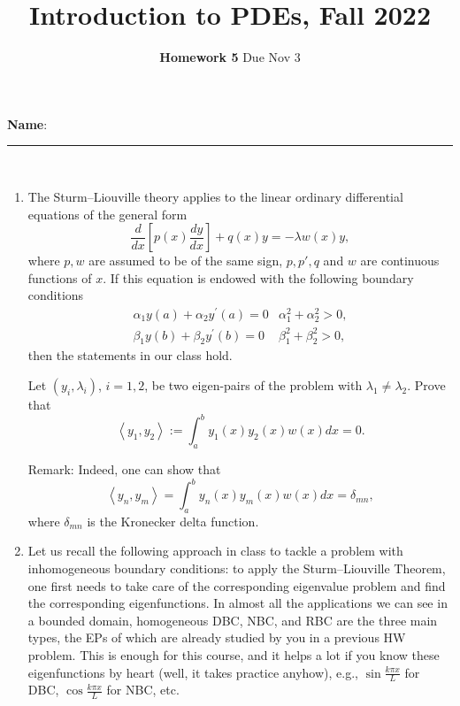 \documentclass[6pt]{article}
\title{Introduction to PDEs, Fall 2022}
\author{\textbf{Homework 5} Due Nov 3}
\date{}
\numberwithin{equation}{section}
\begin{document}
\maketitle

\textbf{Name}:\rule{1 in}{0.001 in} \\
\begin{enumerate}

\item The Sturm--Liouville theory applies to the linear ordinary differential equations of the general form
\[\frac{d}{d x}\left[p(x) \frac{d y}{d x}\right]+q(x) y=-\lambda w(x) y,\]
where $p,w$ are assumed to be of the same sign, $p,p',q$ and $w$ are continuous functions of $x$.  If this equation is endowed with the following boundary conditions
\[
\begin{array}{ll}
\alpha_1 y(a)+\alpha_2 y^{\prime}(a)=0 & \alpha_1^2+\alpha_2^2>0, \\
\beta_1 y(b)+\beta_2 y^{\prime}(b)=0 & \beta_1^2+\beta_2^2>0,
\end{array}
\]
then the statements in our class hold.

Let $(y_i,\lambda_i)$, $i=1,2$, be two eigen-pairs of the problem with $\lambda_1\neq\lambda_2$.  Prove that
\[\left\langle y_1, y_2\right\rangle:=\int_a^b y_1(x) y_2(x) w(x) d x=0.\]

Remark:  Indeed, one can show that
\[\left\langle y_n, y_m\right\rangle=\int_a^b y_n(x) y_m(x) w(x) d x=\delta_{m n},\]
where $\delta_{m n}$ is the Kronecker delta function.

\item Let us recall the following approach in class to tackle a problem with inhomogeneous boundary conditions: to apply the Sturm--Liouville Theorem, one first needs to take care of the corresponding eigenvalue problem and find the corresponding eigenfunctions.  In almost all the applications we can see in a bounded domain, homogeneous DBC, NBC, and RBC are the three main types, the EPs of which are already studied by you in a previous HW problem.  This is enough for this course, and it helps a lot if you know these eigenfunctions by heart (well, it takes practice anyhow), e.g., $\sin\frac{k\pi x}{L}$ for DBC, $\cos\frac{k\pi x}{L}$ for NBC, etc.


\end{enumerate}
\end{document}
